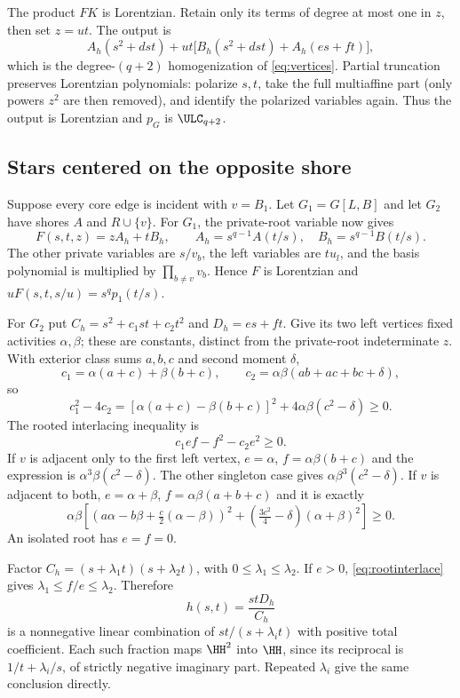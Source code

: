 The product $FK$ is Lorentzian. Retain only its terms of degree at most one in $z$, then set $z=ut$. The output is
\[
 A_h(s^2+dst)+ut\big[B_h(s^2+dst)+A_h(es+ft)\big],
\]
which is the degree-$(q+2)$ homogenization of \eqref{eq:vertices}. Partial truncation preserves Lorentzian polynomials: polarize $s,t$, take the full multiaffine part (only powers $z^2$ are then removed), and identify the polarized variables again. Thus the output is Lorentzian and $p_G$ is $\ULC_{q+2}$.

\subsection{Stars centered on the opposite shore}
Suppose every core edge is incident with $v=B_1$. Let $G_1=G[L,B]$ and let $G_2$ have shores $A$ and $R\cup\{v\}$. For $G_1$, the private-root variable now gives
\[
 F(s,t,z)=zA_h+tB_h,
 \qquad A_h=s^{q-1}A(t/s),\quad B_h=s^{q-1}B(t/s).
\]
The other private variables are $s/v_b$, the left variables are $tu_l$, and the basis polynomial is multiplied by $\prod_{b\ne v}v_b$. Hence $F$ is Lorentzian and $uF(s,t,s/u)=s^qp_1(t/s)$.

For $G_2$ put $C_h=s^2+c_1st+c_2t^2$ and $D_h=es+ft$. Give its two left vertices fixed activities $\alpha,\beta$; these are constants, distinct from the private-root indeterminate $z$. With exterior class sums $a,b,c$ and second moment $\delta$,
\[
 c_1=\alpha(a+c)+\beta(b+c),\qquad c_2=\alpha\beta(ab+ac+bc+\delta),
\]
so
\[
 c_1^2-4c_2=[\alpha(a+c)-\beta(b+c)]^2+4\alpha\beta(c^2-\delta)\ge0.
\]
The rooted interlacing inequality is
\begin{equation}\label{eq:rootinterlace}
 c_1ef-f^2-c_2e^2\ge0.
\end{equation}
If $v$ is adjacent only to the first left vertex, $e=\alpha$, $f=\alpha\beta(b+c)$ and the expression is $\alpha^3\beta(c^2-\delta)$. The other singleton case gives $\alpha\beta^3(c^2-\delta)$. If $v$ is adjacent to both, $e=\alpha+\beta$, $f=\alpha\beta(a+b+c)$ and it is exactly
\[
 \alpha\beta\left[
 \left(a\alpha-b\beta+\tfrac c2(\alpha-\beta)\right)^2
 +\left(\tfrac{3c^2}{4}-\delta\right)(\alpha+\beta)^2\right]\ge0.
\]
An isolated root has $e=f=0$.

Factor $C_h=(s+\lambda_1t)(s+\lambda_2t)$, with $0\le\lambda_1\le\lambda_2$. If $e>0$, \eqref{eq:rootinterlace} gives $\lambda_1\le f/e\le\lambda_2$. Therefore
\[
 h(s,t)=\frac{stD_h}{C_h}
\]
is a nonnegative linear combination of $st/(s+\lambda_i t)$ with positive total coefficient. Each such fraction maps $\HH^2$ into $\HH$, since its reciprocal is $1/t+\lambda_i/s$, of strictly negative imaginary part. Repeated $\lambda_i$ give the same conclusion directly.

